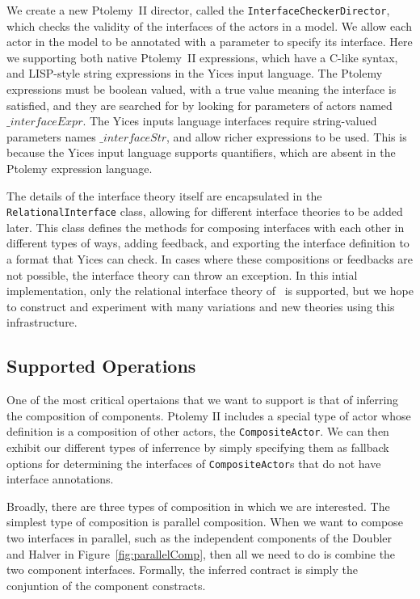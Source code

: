\documentclass[preprint,11pt]{sigplanconf}
\begin{document}
We create a new Ptolemy~II director, called the
\texttt{InterfaceCheckerDirector}, which checks the validity of the interfaces of
the actors in a model. We allow each actor in the model to be annotated with a
parameter to specify its interface. Here we supporting both native Ptolemy~II
expressions, which have a C-like syntax, and LISP-style string expressions in the
Yices input language. The Ptolemy expressions must be boolean valued, with a true
value meaning the interface is satisfied, and they are searched for by looking
for parameters of actors named $\_interfaceExpr$. The Yices inputs language
interfaces require string-valued parameters names $\_interfaceStr$, and allow
richer expressions to be used. This is because the Yices input language supports
quantifiers, which are absent in the Ptolemy expression language.

The details of the interface theory itself are encapsulated in the
\texttt{RelationalInterface} class, allowing for different interface theories
to be added later.  This class defines the methods for composing interfaces
with each other in different types of ways, adding feedback, and exporting the
interface definition to a format that Yices can check. In cases where these
compositions or feedbacks are not possible, the interface theory can throw an
exception.
%
In this intial implementation, only the relational interface theory
of~\cite{relationalInterfaces} is supported, but we hope to construct and
experiment with many variations and new theories using this infrastructure.

\subsection{Supported Operations}
One of the most critical opertaions that we want to support is that of
inferring the composition of components.  Ptolemy II includes a special type
of actor whose definition is a composition of other actors, the
\texttt{CompositeActor}. We can then exhibit our different types of inferrence
by simply specifying them as fallback options for determining the interfaces of
\texttt{CompositeActor}s that do not have interface annotations.

Broadly, there are three types of composition in which we are interested.
%
The simplest type of composition is parallel composition.  When we want to
compose two interfaces in parallel, such as the independent components of the
Doubler and Halver in Figure~\ref{fig:parallelComp}, then all we need to do is
combine the two component interfaces.  Formally, the inferred contract is simply
the conjuntion of the component constracts.
\end{document}
